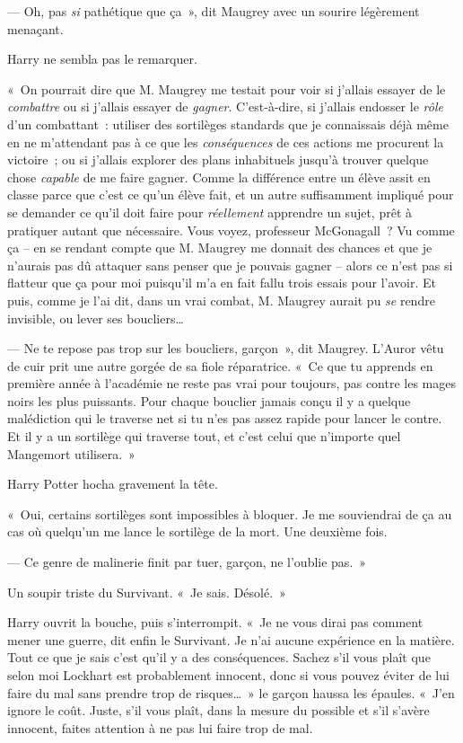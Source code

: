 --- Oh, pas \emph{si} pathétique que ça~», dit Maugrey avec un sourire légèrement menaçant.

Harry ne sembla pas le remarquer.

«~On pourrait dire que M. Maugrey me testait pour voir si j'allais essayer de le \emph{combattre} ou si j'allais essayer de \emph{gagner}. C'est-à-dire, si j'allais endosser le \emph{rôle} d'un combattant~: utiliser des sortilèges standards que je connaissais déjà même en ne m'attendant pas à ce que les \emph{conséquences} de ces actions me procurent la victoire~; ou si j'allais explorer des plans inhabituels jusqu'à trouver quelque chose \emph{capable} de me faire gagner. Comme la différence entre un élève assit en classe parce que c'est ce qu'un élève fait, et un autre suffisamment impliqué pour se demander ce qu'il doit faire pour \emph{réellement} apprendre un sujet, prêt à pratiquer autant que nécessaire. Vous voyez, professeur McGonagall~? Vu comme ça -- en se rendant compte que M. Maugrey me donnait des chances et que je n'aurais pas dû attaquer sans penser que je pouvais gagner -- alors ce n'est pas si flatteur que ça pour moi puisqu'il m'a en fait fallu trois essais pour l'avoir. Et puis, comme je l'ai dit, dans un vrai combat, M. Maugrey aurait pu \emph{se} rendre invisible, ou lever ses boucliers…

--- Ne te repose pas trop sur les boucliers, garçon~», dit Maugrey. L'Auror vêtu de cuir prit une autre gorgée de sa fiole réparatrice. «~Ce que tu apprends en première année à l'académie ne reste pas vrai pour toujours, pas contre les mages noirs les plus puissants. Pour chaque bouclier jamais conçu il y a quelque malédiction qui le traverse net si tu n'es pas assez rapide pour lancer le contre. Et il y a un sortilège qui traverse tout, et c'est celui que n'importe quel Mangemort utilisera.~»

Harry Potter hocha gravement la tête.

«~Oui, certains sortilèges sont impossibles à bloquer. Je me souviendrai de ça au cas où quelqu'un me lance le sortilège de la mort. Une deuxième fois.

--- Ce genre de malinerie finit par tuer, garçon, ne l'oublie pas.~»

Un soupir triste du Survivant. «~Je sais. Désolé.~»

Harry ouvrit la bouche, puis s'interrompit. «~Je ne vous dirai pas comment mener une guerre, dit enfin le Survivant. Je n'ai aucune expérience en la matière. Tout ce que je sais c'est qu'il y a des conséquences. Sachez s'il vous plaît que selon moi Lockhart est probablement innocent, donc si vous pouvez éviter de lui faire du mal sans prendre trop de risques…~» le garçon haussa les épaules. «~J'en ignore le coût. Juste, s'il vous plaît, dans la mesure du possible et s'il s'avère innocent, faites attention à ne pas lui faire trop de mal.

